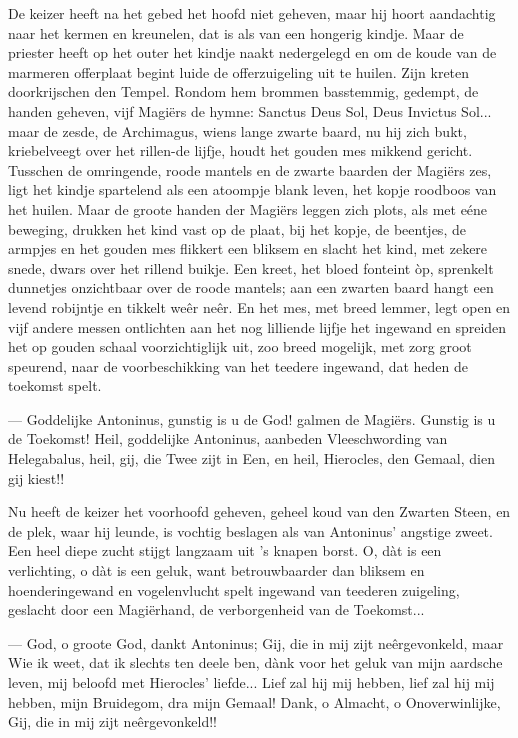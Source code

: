 \documentclass[a4paper, 12pt, oneside, dutch]{article}
\begin{document}
De keizer heeft na het gebed het hoofd niet geheven, maar hij hoort aandachtig naar het kermen en kreunelen, dat is als van een hongerig kindje. Maar de priester heeft op het outer het kindje naakt nedergelegd en om de koude van de marmeren offerplaat begint luide de offerzuigeling uit te huilen. Zijn kreten doorkrijschen den Tempel. Rondom hem brommen basstemmig, gedempt, de handen geheven, vijf Magiërs de hymne: Sanctus Deus Sol, Deus Invictus Sol... maar de zesde, de Archimagus, wiens lange zwarte baard, nu hij zich bukt, kriebelveegt over het rillen-de lijfje, houdt het gouden mes mikkend gericht. Tusschen de omringende, roode mantels en de zwarte baarden der Magiërs zes, ligt het kindje spartelend als een atoompje blank leven, het kopje roodboos van het huilen. Maar de groote handen der Magiërs leggen zich plots, als met eéne beweging, drukken het kind vast op de plaat, bij het kopje, de beentjes, de armpjes en het gouden mes flikkert een bliksem en slacht het kind, met zekere snede, dwars over het rillend buikje. Een kreet, het bloed fonteint òp, sprenkelt dunnetjes onzichtbaar over de roode mantels; aan een zwarten baard hangt een levend robijntje en tikkelt weêr neêr. En het mes, met breed lemmer, legt open en vijf andere messen ontlichten aan het nog lilliende lijfje het ingewand en spreiden het op gouden schaal voorzichtiglijk uit, zoo breed mogelijk, met zorg groot speurend, naar de voorbeschikking van het teedere ingewand, dat heden de toekomst spelt.

--- Goddelijke Antoninus, gunstig is u de God! galmen de Magiërs. Gunstig is u de Toekomst! Heil, goddelijke Antoninus, aanbeden Vleeschwording van Helegabalus, heil, gij, die Twee zijt in Een, en heil, Hierocles, den Gemaal, dien gij kiest!!

Nu heeft de keizer het voorhoofd geheven, geheel koud van den Zwarten Steen, en de plek, waar hij leunde, is vochtig beslagen als van Antoninus' angstige zweet. Een heel diepe zucht stijgt langzaam uit 's knapen borst. O, dàt is een verlichting, o dàt is een geluk, want betrouwbaarder dan bliksem en hoenderingewand en vogelenvlucht spelt ingewand van teederen zuigeling, geslacht door een Magiërhand, de verborgenheid van de Toekomst...

--- God, o groote God, dankt Antoninus; Gij, die in mij zijt neêrgevonkeld, maar Wie ik weet, dat ik slechts ten deele ben, dànk voor het geluk van mijn aardsche leven, mij beloofd met Hierocles' liefde... Lief zal hij mij hebben, lief zal hij mij hebben, mijn Bruidegom, dra mijn Gemaal! Dank, o Almacht, o Onoverwinlijke, Gij, die in mij zijt neêrgevonkeld!!
\end{document}
